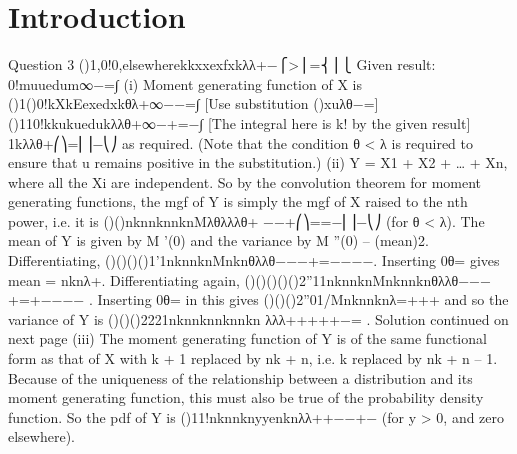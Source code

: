 \documentclass{article}
\author{kobriendublin }
\date{December 2018}
\begin{document}
\section{Introduction}
\begin{enumerate}[(i)]    Question 3
          ()1,0!0,elsewherekkxxexfxkλλ+−⎧>⎪=⎨⎪⎩
          Given result: 0!muuedum∞−=∫
          (i) Moment generating function of X is
          ()1()0!kXkEexedxkθλ+∞−−=∫ [Use substitution ()xuλθ−=]
          ()110!kkukuedukλλθ+∞−+=−∫ [The integral here is k! by the given result]
          1kλλθ+⎛⎞=⎜⎟−⎝⎠ as required.
          (Note that the condition θ < λ is required to ensure that u remains positive in the substitution.)
          (ii) Y = X1 + X2 + … + Xn, where all the Xi are independent. So by the convolution theorem for moment generating functions, the mgf of Y is simply the mgf of X raised to the nth power, i.e. it is
          ()()nknnknnknMλθλλλθ+ −−+⎛⎞==−⎜⎟−⎝⎠ (for θ < λ).
          The mean of Y is given by M '(0) and the variance by {M ''(0) – (mean)2}.
          Differentiating, ()()()()1'1nknnknMnknθλλθ−−−+=−−−−.
          Inserting 0θ= gives mean = nknλ+.
          Differentiating again, ()()()()()2''11nknnknMnknnknθλλθ−−−+=+−−−− .
          Inserting 0θ= in this gives ()()()2''01/Mnknnknλ=+++ and so the variance of Y is
          ()()()2221nknnknnknnkn λλλ+++++−= .
          Solution continued on next page
          (iii) The moment generating function of Y is of the same functional form as that of X with k + 1 replaced by nk + n, i.e. k replaced by nk + n – 1. Because of the uniqueness of the relationship between a distribution and its moment generating function, this must also be true of the probability density function. So the pdf of Y is
          ()11!nknnknyyenknλλ++−−+− (for y > 0, and zero elsewhere).\end{enumerate}
\end{document}
